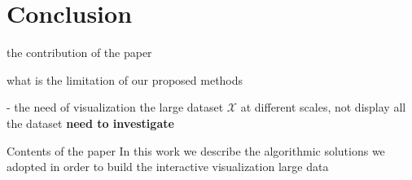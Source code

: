 \section{Conclusion}
\label{sec:conclusion}

the contribution of the paper

what is the limitation of our proposed methods

- the need of visualization the large dataset $\mathcal{X}$ at different scales, not display all the dataset \textbf{need to investigate}

Contents of the paper
In this work we describe the algorithmic solutions we adopted in order
to build the interactive visualization large data


